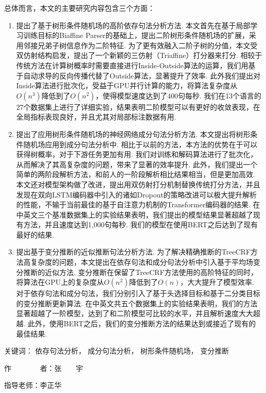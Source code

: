 \begin{cabstract}
  总体而言，本文的主要研究内容包含三个方面：
  \begin{enumerate}
    \item 提出了基于树形条件随机场的高阶依存句法分析方法.
          本文首先在基于局部学习训练目标的Biaffine Parser的基础上，提出二阶树形条件随机场的扩展，采用邻接兄弟子树信息作为二阶特征.
          为了更有效融入二阶子树的分值，本文受双仿射结构启发，提出了一个新颖的三仿射（Triaffine）打分器来打分.
          相较于传统方法在计算树概率时需要直接进行Inside-Outside算法的运算，我们用基于自动求导的反向传播代替了Outside算法，显著提升了效率.
          此外我们提出对Inside算法进行批次化，受益于GPU并行计算的能力，将算法复杂度从$O(n^3)$降低到了$O(n^2)$，使得模型速度达到了400句每秒.
          我们在13个语言的27个数据集上进行了详细实验，结果表明二阶模型可以有更好的收敛表现，在全局指标表现良好，并且尤其对局部标注数据有用.
    \item 提出了应用树形条件随机场的神经网络成分句法分析方法.
          本文提出将树形条件随机场应用到成分句法分析中.
          相比于以前的方法，本方法的优势在于可以获得树概率，对于下游任务更加有用.
          我们对训练和解码算法进行了批次化，从而解决了其高复杂度的问题，带来了显著的效率提升.
          此外，我们提出一个简单的两阶段解析方法，和前人的一阶段解析相比结果相当，但是更加高效.
          本文还对模型架构做了改进，提出用双仿射打分机制替换传统打分方法，并且发现在双向LSTM编码器中引入的诸如Dropout的策略改进可以极大提升解析的性能，不输于当前最佳的基于自注意力机制的Transformer编码器的结果.
          在中英文三个基准数据集上的实验结果表明，我们提出的模型结果显著超越了现有方法，并且速度达到1,000句每秒.
          我们的模型在使用BERT之后达到了现有最好的结果.
    \item 提出基于变分推断的近似推断句法分析方法.
          为了解决精确推断的TreeCRF方法高复杂度的问题，本文提出在依存句法和成分句法分析中引入基于平均场变分推断的近似方法.
          变分推断在保留了TreeCRF方法使用的高阶特征的同时，将算法在GPU上的复杂度从$O(n^2)$降低到了$O(n)$，大大提升了模型效率.
          对于依存句法和成分句法，我们分别引入了基于头选择目标和基于二分类目标的变分推断更新算法.
          在中英文共五个数据集上的实验结果表明，我们的方法显著超越了一阶模型，达到了和二阶模型可比较的水平，并且解析速度大大超越.
          此外，使用BERT之后，我们的变分推断方法的结果达到或接近了现有的最佳结果.
  \end{enumerate}



  \vskip 21bp
    {\heiti{} 关键词：}
  依存句法分析，
  成分句法分析，
  树形条件随机场，
  变分推断

  \begin{flushright}
    作~~~~~~~~者：张~~~~宇

    指导老师：李正华

  \end{flushright}
\end{cabstract}


